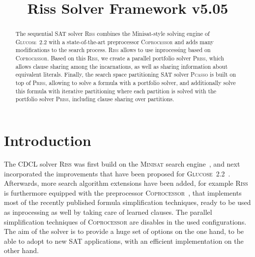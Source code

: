 \documentclass[conference]{IEEEtran}
\begin{document}
	
\title{Riss Solver Framework v5.05}

\author{
}

\maketitle

\def\coprocessor{\textsc{Coprocessor}\xspace}
\def\glucose{\textsc{Glucose~2.2}\xspace}
\def\minisat{\textsc{Minisat~2.2}\xspace}
\def\riss{\textsc{Riss}\xspace}
\def\priss{\textsc{Priss}\xspace}
\def\pcasso{\textsc{Pcasso}\xspace}

\begin{abstract}
The sequential SAT solver \riss combines the Minisat-style solving engine of \glucose with a state-of-the-art preprocessor \textsc{Coprocessor} and adds many modifications to the search process. 
\riss allows to use inprocessing based on \coprocessor.
Based on this \riss, we create a parallel portfolio solver \priss, which allows clause sharing among the incarnations, as well as sharing information about equivalent literals. 
Finally, the search space partitioning SAT solver \pcasso is built on top of \priss, allowing to solve a formula with a portfolio solver, and additionally solve this formula with iterative partitioning where each partition is solved with the portfolio solver \priss, including clause sharing over partitions. 
\end{abstract}

\section{Introduction}

The CDCL solver \riss was first build on the \textsc{Minisat} search engine~\cite{EenS:2003}, and next incorporated the improvements that have been proposed for \glucose ~\cite{AudemardS:2009,Audemard:2012:RRS:2405292.2405308}. 
Afterwards, more search algorithm extensions have been added, for example 
\riss is furthermore equipped with the preprocessor \textsc{Coprocessor}~\cite{Manthey:2012}, 
that implements most of the recently published formula simplification techniques, ready to be used as inprocessing as well by taking care of learned clauses. 
The parallel simplification techniques of \coprocessor are disables in the used configurations. 
The aim of the solver is to provide a huge set of options on the one hand, to be able to adopt to new SAT applications, with an efficient implementation on the other hand. 
\end{document}
